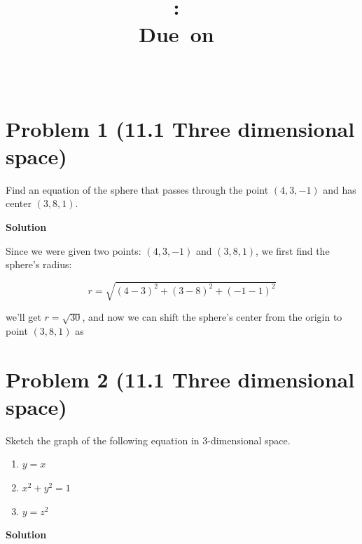 \documentclass{article}
\title{
    \vspace{2in}
    \textmd{\textbf{\hmwkClass:\ \hmwkTitle}}\\
    \normalsize\vspace{0.1in}\small{Due\ on\ \hmwkDueDate}\\
    \vspace{0.1in}\large{\textit{\hmwkClassInstructor\ \hmwkClassTime}}
    \vspace{3in}
}
\author{\hmwkAuthorName}
\date{}
\newcommand{\solution}{\textbf{\large Solution}}
\theoremstyle{remark}
\begin{document}
\maketitle
\newpage

\section*{Problem 1 (11.1 Three dimensional space)}
Find an equation of the sphere that passes through the point $(4,3,-1)$ and has center $(3,8,1)$.

\medskip
\solution

Since we were given two points: $(4, 3, -1)$ and $(3, 8, 1)$, we first find the sphere's radius: 

\[r = \sqrt{(4-3)^2 + (3-8)^2 + (-1-1)^2}\]

we'll get $r = \sqrt{30}$, and now we can shift the sphere's center from the origin to point $(3, 8, 1)$ as \\
\begin{center}
\end{center}    %

\vspace{1em}
\hrulefill

\section*{Problem 2 (11.1 Three dimensional space)}
Sketch the graph of the following equation in 3-dimensional space.
\begin{enumerate}[label=(\alph*)]
    \item $y = x$
    \item $x^2 + y^2 = 1$
    \item $y = z^2$
\end{enumerate}

\medskip
\solution
\end{document}
